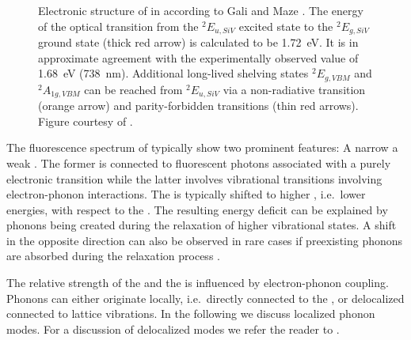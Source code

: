     \begin{figure}[!htb]
      \centering
      \caption[Electronic structure of \sivs hosted in diamond]{Electronic structure of \sivs in \nd according to Gali and Maze \cite{Gali2013}. The energy of the optical transition from the ${}^{2}E_{u, SiV}$ excited state to the ${}^{2}E_{g, SiV}$ ground state (thick red arrow) is calculated to be \SI{1.72}{\eV}. It is in approximate agreement with the experimentally observed value of \SI{1.68}{\eV} (\SI{738}{\nm}). Additional long-lived shelving states ${}^{2}E_{g, VBM}$ and ${}^{2}A_{1g, VBM}$ can be reached from  ${}^{2}E_{u, SiV}$ via a non-radiative transition (orange arrow) and parity-forbidden transitions (thin red arrows). Figure courtesy of \cite{Hepp2014dissertation}.}
      \label{fig::term_scheme_siv}
    \end{figure}

    The fluorescence spectrum of \sivs typically show two prominent features: A narrow \zpl a weak \psb. The former is connected to fluorescent photons associated with a purely electronic transition while the latter involves vibrational transitions involving electron-phonon interactions. The \psb is typically shifted to higher \wl, i.e.\ lower energies, with respect to the \zpl. The resulting energy deficit can be explained by phonons being created during the relaxation of higher vibrational states. A shift in the opposite direction can also be observed in rare cases if preexisting phonons are absorbed during the relaxation process \cite{Iakoubovskii2000thesis}.

    The relative strength of the \zpl and the \psb is influenced by electron-phonon coupling. Phonons can either originate locally, i.e.\ directly connected to the \siv, or delocalized connected to lattice vibrations. In the following we discuss localized phonon modes. For a discussion of delocalized modes we refer the reader to \cite{Feng1993b}. 

